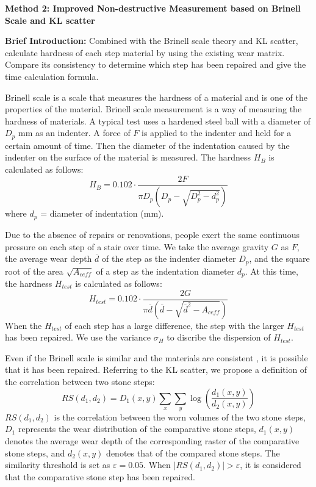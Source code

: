 \documentclass[12pt]{article}  %
\numberwithin{equation}{section} %
\begin{document}
\textbf{Method 2: Improved Non-destructive Measurement based on Brinell Scale and KL scatter}

\textbf{Brief Introduction:} Combined with the Brinell scale theory and KL scatter, calculate hardness of each step material by using the existing wear matrix. Compare its consistency to determine which step has been repaired and give the time calculation formula.

Brinell scale is a scale that measures the hardness of a material and is one of the properties of the material. Brinell scale measurement is a way of measuring the hardness of materials. A typical test uses a hardened steel ball with a diameter of $D_p$ mm as an indenter. A force of $F$ is applied to the indenter and held for a certain amount of time. Then the diameter of the indentation caused by the indenter on the surface of the material is measured. The hardness $H_B$ is calculated as follows:
\begin{equation}
    H_{B} = 0.102 \cdot \frac{2F}{\pi D_p \left( D_p - \sqrt{D_p^2 - d_p^2} \right)}
\end{equation}
where $d_p$ = diameter of indentation (mm).

Due to the absence of repairs or renovations, people exert the same continuous pressure on each step of a stair over time. We take the average gravity $G$ as $F$, the average wear depth $\overline{d}$ of the step as the indenter diameter $D_p$, and the square root of the area $\sqrt{A_{ceff}}$ of a step as the indentation diameter $d_p$. At this time, the hardness $H_{test}$ is calculated as follows:
\begin{equation}
    H_{test} = 0.102 \cdot \frac{2G}{\pi {\overline{d}} \left( {\overline{d}} - \sqrt{{\overline{d}}^2 - A_{ceff}} \right)}
\end{equation}
When the $H_{test}$ of each step has a large difference, the step with the larger $H_{test}$ has been repaired. We use the variance $\sigma_H$ to discribe the dispersion of $H_{test}$.


 Even if the Brinell scale is similar and  the materials are consistent , it is possible that it has been repaired. Referring to the KL scatter, we propose a definition of the correlation between two stone steps:
 \begin{equation}
     RS(d_1, d_2) = D_1(x, y) \sum_x \sum_y \log \left( \frac{d_1(x, y)}{d_2(x, y)} \right)
 \end{equation}
 $RS(d_1, d_2)$ is the correlation between the worn volumes of the two stone steps, $D_1$ represents the wear distribution of the comparative stone steps, $d_1(x, y)$ denotes the average wear depth of the corresponding raster of the comparative stone steps, and $d_2(x, y)$ denotes that of the compared stone steps. The similarity threshold is set as $\varepsilon=0.05$. When $|RS(d_1, d_2)|>\varepsilon$, it is considered that the comparative stone step has been repaired. 
 
\end{document}
